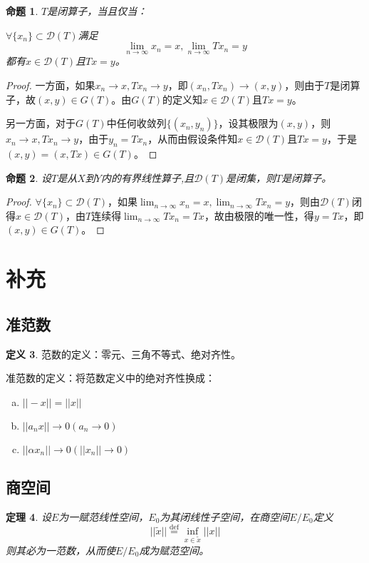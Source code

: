 \documentclass[winfonts,UTF8,c5size,a4paper,fancyhdr,hyperref,titlepage,nocap]{ctexart}
\theoremstyle{question}
\theoremstyle{theorem}
\newtheorem{thm}{定理}
\newtheorem{prop}[thm]{命题}
\theoremstyle{definition}
\newtheorem{defn}[thm]{定义}
\theoremstyle{remark}
\numberwithin{equation}{subsection}
\newcommand{\red}{\color{red}}
\newcommand{\defeq}{\stackrel{{\mathrm{def}}}{=}}
\begin{document}
\begin{prop}
  $T$是闭算子，当且仅当：

  $\forall\{x_n\}\subset\mathcal{D}(T)$满足
  \begin{equation*}
  \lim_{n\to\infty}x_n=x, \lim_{n\to\infty}Tx_n=y
  \end{equation*}
  都有$x\in\mathcal{D}(T)$且$Tx=y$。
\end{prop}
\begin{proof}
  一方面，如果$x_n\to x,Tx_n\to y$，即$(x_n,Tx_n)\to(x,y)$，则由于$T$是闭算子，故$(x,y)\in G(T)$。由$G(T)$的定义知$x\in\mathcal{D}(T)$且$Tx=y$。

 另一方面，对于$G(T)$中任何收敛列$\{(x_n,y_n)\}$，设其极限为$(x,y)$，则$x_n\to x,Tx_n\to y$，由于$y_n=Tx_n$，从而由假设条件知$x\in\mathcal{D}(T)$且$Tx=y$，于是$(x,y)=(x,Tx)\in G(T)$。
\end{proof}

\begin{prop}
  设$T$是从$X$到$Y$内的{\red 有界}线性算子,且$\mathcal{D}(T)$是闭集，则$T$是闭算子。
\end{prop}
\begin{proof}
  $\forall\{x_n\}\subset\mathcal{D}(T)$，如果$\lim_{n\to\infty}x_n=x, \lim_{n\to\infty}Tx_n=y$，则由$\mathcal{D}(T)$闭得$x\in\mathcal{D}(T)$，由$T$连续得$\lim_{n\to\infty}Tx_n=Tx$，故由极限的唯一性，得$y=Tx$，即$(x,y)\in G(T)$。
\end{proof}

\section{补充}
\subsection{准范数}
\begin{defn}
范数的定义：零元、三角不等式、绝对齐性。

准范数的定义：将范数定义中的绝对齐性换成：
\begin{enumerate}[a)]
    \setlength{\itemindent}{2ex}
    \item $||-x||=||x||$
    \item $||a_nx||\to0(a_n\to0)$
    \item $||\alpha x_n||\to0(||x_n||\to0)$
\end{enumerate}
\end{defn}

\subsection{商空间}
\begin{thm}
设$E$为一赋范线性空间，$E_0$为其闭线性子空间，在商空间$E/E_0$定义
\begin{equation*}
||\widetilde{x}||\defeq\inf_{x\in\widetilde{x}}||x||
\end{equation*}
则其必为一范数，从而使$E/E_0$成为赋范空间。
\end{thm}
\end{document}
